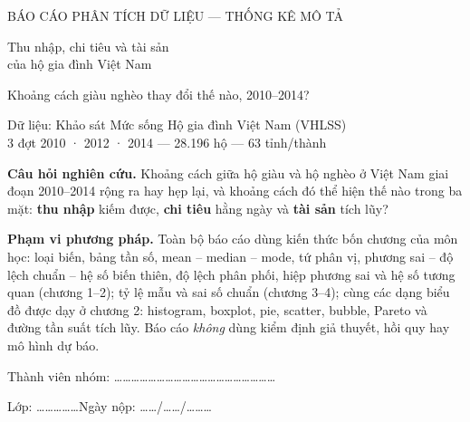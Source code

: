 \documentclass[11pt,a4paper]{article}
\begin{document}
\thispagestyle{empty}
\begin{center}
\vspace*{2.2cm}
{\footnotesize\color{blue}\MakeUppercase{Báo cáo phân tích dữ liệu — thống kê mô tả}\par}
\vspace{10pt}
{\fontsize{26}{31}\selectfont\heavy\color{ink} Thu nhập, chi tiêu và tài sản\\của hộ gia đình Việt Nam\par}
\vspace{10pt}
{\large\color{ink2} Khoảng cách giàu nghèo thay đổi thế nào, 2010–2014?\par}
\vspace{18pt}
{\color{ink2} Dữ liệu: Khảo sát Mức sống Hộ gia đình Việt Nam (VHLSS)\\ 3 đợt 2010 · 2012 · 2014 — 28.196 hộ — 63 tỉnh/thành\par}
\vspace{26pt}
\begin{tcolorbox}[colback=tintN, colframe=tintN, boxrule=0pt, arc=5pt, width=0.86\linewidth, left=14pt, right=14pt, top=10pt, bottom=10pt]
\small
\textbf{Câu hỏi nghiên cứu.} Khoảng cách giữa hộ giàu và hộ nghèo ở Việt Nam giai đoạn 2010–2014 rộng ra hay hẹp lại, và khoảng cách đó thể hiện thế nào trong ba mặt: \textbf{thu nhập} kiếm được, \textbf{chi tiêu} hằng ngày và \textbf{tài sản} tích lũy?\par
\vspace{6pt}
\textbf{Phạm vi phương pháp.} Toàn bộ báo cáo dùng kiến thức bốn chương của môn học: loại biến, bảng tần số, mean – median – mode, tứ phân vị, phương sai – độ lệch chuẩn – hệ số biến thiên, độ lệch phân phối, hiệp phương sai và hệ số tương quan (chương 1–2); tỷ lệ mẫu và sai số chuẩn (chương 3–4); cùng các dạng biểu đồ được dạy ở chương 2: histogram, boxplot, pie, scatter, bubble, Pareto và đường tần suất tích lũy. Báo cáo \emph{không} dùng kiểm định giả thuyết, hồi quy hay mô hình dự báo.
\end{tcolorbox}
\vspace{22pt}
{\color{muted} Thành viên nhóm: …………………………………………………\par\vspace{4pt} Lớp: ……………\qquad Ngày nộp: ……/……/………\par}
\end{center}
\newpage

{\small\tableofcontents}
\newpage

\end{document}

